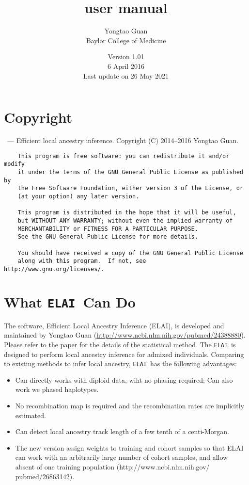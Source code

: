 \documentclass[11pt,Palatino]{article}
\title{ \elai user manual}
\author{Yongtao Guan \\ Baylor College of Medicine}
\date{Version 1.01 \\ 6 April 2016 \\Last update on 26 May 2021}
\def\elai{{\tt{ELAI}}~}
\begin{document}
\maketitle
\tableofcontents
\clearpage

\section{Copyright}

\indent \elai --- Efficient local ancestry inference.
    Copyright (C) 2014--2016 Yongtao Guan. 
\begin{verbatim}
    This program is free software: you can redistribute it and/or modify
    it under the terms of the GNU General Public License as published by
    the Free Software Foundation, either version 3 of the License, or
    (at your option) any later version.

    This program is distributed in the hope that it will be useful,
    but WITHOUT ANY WARRANTY; without even the implied warranty of
    MERCHANTABILITY or FITNESS FOR A PARTICULAR PURPOSE.  
    See the GNU General Public License for more details.

    You should have received a copy of the GNU General Public License
    along with this program.  If not, see http://www.gnu.org/licenses/.
\end{verbatim}


\section{What \elai Can Do}
The software, Efficient Local Ancestry Inference (ELAI), is developed and maintained by Yongtao Guan (\url{http://www.ncbi.nlm.nih.gov/pubmed/24388880}).  Please refer to the paper for the details of the statistical method. The \elai is designed to perform local ancestry inference for admixed individuals. Comparing to existing methods to infer local ancestry, \elai has the following advantages: 
\begin{itemize}
\itemsep-0.05in 
 \item Can directly works with diploid data, wiht no phasing required; Can also work we phased haplotypes. 
 \item No recombination map is required and the recombination rates are implicitly estimated. 
 \item Can detect local ancestry track length of a few tenth of a centi-Morgan.
 \item The new version assign weights to training and cohort samples so that ELAI can work with an arbitrarily large number of cohort samples, and allow absent of one training population (http://www.ncbi.nlm.nih.gov/ pubmed/26863142). 

\end{itemize}
\end{document}
